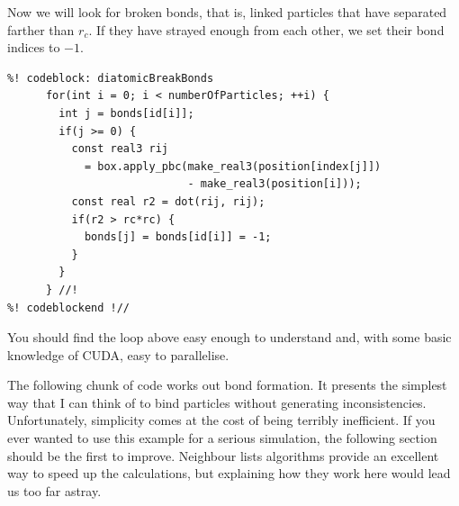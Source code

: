 Now we will look for broken bonds, that is, linked particles that have separated 
farther than $r_c$. If they have strayed enough from each other, we set their
bond indices to $-1$.
\begin{lstlisting}
%! codeblock: diatomicBreakBonds
      for(int i = 0; i < numberOfParticles; ++i) {
        int j = bonds[id[i]];
        if(j >= 0) {
          const real3 rij
            = box.apply_pbc(make_real3(position[index[j]])
                            - make_real3(position[i]));
          const real r2 = dot(rij, rij);
          if(r2 > rc*rc) {
            bonds[j] = bonds[id[i]] = -1;
          }
        }
      } //!
%! codeblockend !//
\end{lstlisting}
You should find the loop above easy enough to understand and, with some basic 
knowledge of CUDA, easy to parallelise.

The following chunk of code works out bond formation. It presents the simplest 
way that I can think of to bind particles without generating inconsistencies. 
Unfortunately, simplicity comes at the cost of being terribly inefficient. If 
you ever wanted to use this example for a serious simulation, the following 
section should be the first to improve. Neighbour lists algorithms provide an 
excellent way to speed up the calculations, but explaining how they work here 
would lead us too far astray.

